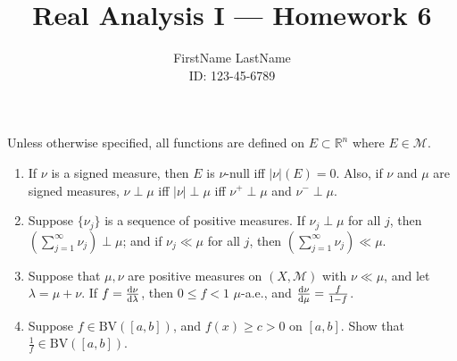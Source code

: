 \documentclass{article}
\title{Real Analysis I --- Homework 6}
\author{FirstName LastName \\ ID: 123-45-6789}
\date{}
\newcommand{\Mcal}{\mathcal{M}}
\begin{document}
\maketitle

Unless otherwise specified, all functions are defined on $E \subset \mathbb{R}^{n}$ where $E \in \mathcal{M}$.
\bigskip


\begin{enumerate}

\item If $\nu$ is a signed measure, then $E$ is $\nu$-null iff $|\nu|(E) = 0$. Also, if $\nu$ and $\mu$ are signed measures, $\nu \perp \mu$ iff $|\nu| \perp \mu$ iff $\nu^{+} \perp \mu$ and $\nu^{-} \perp \mu$.




\item Suppose $\{\nu_{j}\}$ is a sequence of positive measures. If $\nu_{j} \perp \mu$ for all $j$, then $(\sum_{j=1}^{\infty} \nu_{j}) \perp \mu$; and if $\nu_{j} \ll \mu$ for all $j$, then $(\sum_{j=1}^{\infty}  \nu_{j}) \ll \mu$.




\item Suppose that $\mu, \nu$ are positive measures on $(X, \Mcal)$ with $\nu \ll \mu$, and let $\lambda = \mu + \nu$. If $f = \frac{\dif \nu}{\dif \lambda}$, then $0 \le f < 1$ $\mu$-a.e., and $\frac{\dif \nu}{\dif \mu} = \frac{f}{1-f}$.





\item Suppose $f \in \mathrm{BV}([a,b])$, and $f(x) \ge c > 0$ on $[a,b]$. Show that $\frac{1}{f} \in \mathrm{BV}([a,b])$.


\end{enumerate}
\end{document}
